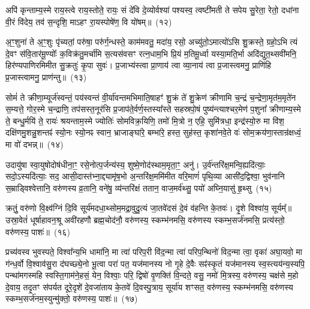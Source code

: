 अपि॑ कृन्ताम्य॒स्मे राय॒स्त्वे राय॒स्तोते॒ रायः॒ सं दे॑वि दे॒व्योर्वश्या॑ पश्यस्व॒ त्वष्टी॑मती ते सपेय सु॒रेता॒ रेतो॒ दधा॑ना वी॒रं वि॑देय॒ तव॑ स॒न्दृशि॒ मा\-ऽहꣳ रा॒यस्पोषे॑ण॒ वि यो॑षम्॥~(१२)

{\anuvakamend[{अ॒स्य॒ ग्री॒वा एका॒न्नत्रि॒ꣳ॒शच्च॑}]}%

अ॒ꣳ॒शुना॑ ते अ॒ꣳ॒शुः पृ॑च्यतां॒ परु॑षा॒ परु॑र्ग॒न्धस्ते॒ काम॑मवतु॒ मदा॑य॒ रसो॒ अच्यु॑तो॒\-ऽमात्यो॑\-ऽसि शु॒क्रस्ते॒ ग्रहो॒\-ऽभि त्यं दे॒वꣳ स॑वि॒तार॑मू॒ण्योः᳚ क॒विक्र॑तु॒मर्चा॑मि स॒त्यस॑वसꣳ रत्न॒धाम॒भि प्रि॒यं म॒तिमू॒र्ध्वा यस्या॒मति॒र्भा अदि॑द्युत॒थ्सवी॑मनि॒ हिर॑ण्यपाणिरमिमीत सु॒क्रतुः॑ कृ॒पा सुवः॑। प्र॒जाभ्य॑स्त्वा प्रा॒णाय॑ त्वा व्या॒नाय॑ त्वा प्र॒जास्त्वमनु॒ प्राणि॑हि प्र॒जास्त्वामनु॒ प्राण॑न्तु॥~(१३)

{\anuvakamend[{अनु॑ स॒प्त च॑}]}%

सोमं॑ ते क्रीणा॒म्यूर्ज॑स्वन्तं॒ पय॑स्वन्तं वी॒र्या॑वन्तमभिमाति॒\-षाहꣳ॑ शु॒क्रं ते॑ शु॒क्रेण॑ क्रीणामि च॒न्द्रं च॒न्द्रेणा॒मृत॑म॒मृते॑न स॒म्यत्ते॒ गोर॒स्मे च॒न्द्राणि॒ तप॑सस्त॒नूर॑सि प्र॒जा\-प॑ते॒र्वर्ण॒स्तस्या᳚स्ते सहस्रपो॒षं पुष्य॑न्त्याश्चर॒मेण॑ प॒शुना᳚ क्रीणाम्य॒स्मे ते॒ बन्धु॒र्मयि॑ ते॒ रायः॑ श्रयन्ताम॒स्मे ज्योतिः॑ सोमविक्र॒यिणि॒ तमो॑ मि॒त्रो न॒ एहि॒ सुमि॑त्रधा॒ इन्द्र॑स्यो॒रु मा वि॑श॒ दक्षि॑णमु॒शन्नु॒शन्तꣴ॑ स्यो॒नः स्यो॒नꣴ स्वान॒ भ्राजाङ्घा॑रे॒ बम्भा॑रे॒ हस्त॒ सुह॑स्त॒ कृशा॑नवे॒ते वः॑ सोम॒क्रय॑णा॒स्तान्र॑क्षध्वं॒ मा वो॑ दभन्न्॥~(१४)

{\anuvakamend[{ऊ॒रुं द्वाविꣳ॑शतिश्व}]}%

उदायु॑षा स्वा॒युषोदोष॑धीना॒ꣳ॒ रसे॒नोत्प॒र्जन्य॑स्य॒ शुष्मे॒णोद॑स्था\-म॒मृता॒ꣳ॒ अनु॑। उ॒र्व॑न्तरि॑क्ष॒मन्वि॒ह्यदि॑त्याः॒ सदो॒\-ऽस्यदि॑त्याः॒ सद॒ आसी॒\-दास्त॑भ्ना॒द्द्यामृ॑ष॒भो अ॒न्तरि॑क्ष॒ममि॑मीत वरि॒माणं॑ पृथि॒व्या आसी॑द॒द्विश्वा॒ भुव॑नानि स॒म्राड्विश्वेत्तानि॒ वरु॑णस्य व्र॒तानि॒ वने॑षु॒ व्य॑न्तरि॑क्षं ततान॒ वाज॒मर्व॑थ्सु॒ पयो॑ अघ्नि॒यासु॑ हृ॒थ्सु~(१५)

क्रतुं॒ वरु॑णो वि॒क्ष्व॑ग्निं दि॒वि सूर्य॑मदधा॒थ्सोम॒मद्रा॒वुदु॒त्यं जा॒तवे॑दसं दे॒वं व॑हन्ति के॒तवः॑। दृ॒शे विश्वा॑य॒ सूर्यम्᳚॥ उस्रा॒वेतं॑ धूर्\mbox{}षाहावन॒श्रू अवी॑रहणौ ब्रह्म॒चोद॑नौ॒ वरु॑णस्य॒ स्कम्भ॑नमसि॒ वरु॑णस्य स्कम्भ॒सर्ज॑नमसि॒ प्रत्य॑स्तो॒ वरु॑णस्य॒ पाशः॑॥~(१६)

{\anuvakamend[{हृ॒थ्सु पञ्च॑त्रिꣳशच्च}]}%

प्रच्य॑वस्व भुवस्पते॒ विश्वा᳚न्य॒भि धामा॑नि॒ मा त्वा॑ परिप॒री वि॑द॒न्मा त्वा॑ परिप॒न्थिनो॑ विद॒न्मा त्वा॒ वृका॑ अघा॒यवो॒ मा ग॑न्ध॒र्वो वि॒श्वाव॑सु॒रा द॑घच्छ्ये॒नो भू॒त्वा परा॑ पत॒ यज॑मानस्य नो गृ॒हे दे॒वैः सꣴ॑स्कृ॒तं यज॑मानस्य स्व॒स्त्यय॑न्य॒स्यपि॒ पन्था॑मगस्महि स्वस्ति॒गाम॑ने॒हसं॒ येन॒ विश्वाः॒ परि॒ द्विषो॑ वृ॒णक्ति॑ वि॒न्दते॒ वसु॒ नमो॑ मि॒त्रस्य॒ वरु॑णस्य॒ चक्ष॑से म॒हो दे॒वाय॒ तदृ॒तꣳ स॑पर्यत दूरे॒\-दृशे॑ दे॒व\-जा॑ताय के॒तवे॑ दि॒वस्पु॒त्राय॒ सूर्या॑य शꣳसत॒ वरु॑णस्य॒ स्कम्भ॑\-नमसि॒ वरु॑णस्य स्कम्भ॒\-सर्ज॑नम॒स्युन्मु॑क्तो॒ वरु॑णस्य॒ पाशः॑॥~(१७)

